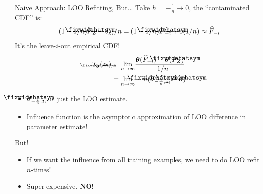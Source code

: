 \documentclass[blue]{beamer}
\newcommand\lowerwidehatsym{%
  \text{\smash{\raisebox{-1.3ex}{%
    $\fixwidehatsym$}}}}
\newcommand\fixwidehat[1]{%
  \mathchoice
    {\accentset{\displaystyle\lowerwidehatsym}{#1}}
    {\accentset{\textstyle\lowerwidehatsym}{#1}}
    {\accentset{\scriptstyle\lowerwidehatsym}{#1}}
    {\accentset{\scriptscriptstyle\lowerwidehatsym}{#1}}
}
\begin{document}
\begin{frame}{Naive Approach: LOO Refitting, But...}
 Take $h=-\frac{1}{n}\to0$, the ``contaminated CDF'' is:
 $$
 (1+1/n)\fixwidehat{F}_Z- \delta_{\bm{z}_{i}}/n = (1+1/n)\fixwidehat{F}_{-i} + o(1/n)\approx \widehat{F}_{-i}
 $$
 It's the leave-$i$-out empirical CDF!
\begin{align}\label{I_theta}
\mathcal{I}_{\fixwidehat{\bm{\theta}}}(\bm{z}_{i}) &= \underset{n \to \infty}{\lim}\frac{\bm{\theta}(\widehat{F}_{-i}) - \bm{\theta}(\fixwidehat{F}_Z)}{-1/n} \notag\\
 &= \underset{n \to \infty}{\lim}-n(\fixwidehat{\bm{\theta}}_{-\frac{1}{n}, \bm{z}_i} - \fixwidehat{\bm{\theta}}) 
\end{align}
\begin{itemize}
  \item $\fixwidehat{\bm{\theta}}_{-\frac{1}{n}, \bm{z}_i}$ is just the LOO estimate. 
  \item Influence function is the asymptotic approximation of LOO difference in parameter estimate!
\end{itemize}
\end{frame}

\begin{frame}{But!}
\begin{itemize}
  \item If we want the influence from all training examples, we need to do LOO refit $n$-times!
  \item Super expensive. \textbf{NO}!
\end{itemize}
\end{frame}
\end{document}
